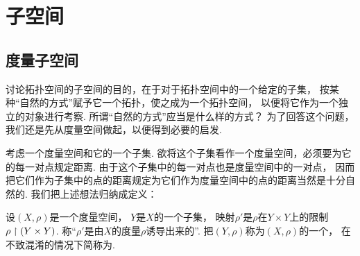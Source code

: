 \section{子空间}
\subsection{度量子空间}
讨论拓扑空间的子空间的目的，在于对于拓扑空间中的一个给定的子集，
按某种“自然的方式”赋予它一个拓扑，使之成为一个拓扑空间，
以便将它作为一个独立的对象进行考察.
所谓“自然的方式”应当是什么样的方式？
为了回答这个问题，我们还是先从度量空间做起，以便得到必要的启发.

考虑一个度量空间和它的一个子集.
欲将这个子集看作一个度量空间，必须要为它的每一对点规定距离.
由于这个子集中的每一对点也是度量空间中的一对点，
因而把它们作为子集中的点的距离规定为它们作为度量空间中的点的距离当然是十分自然的.
我们把上述想法归纳成定义：
\begin{definition}
设\((X,\rho)\)是一个度量空间，
\(Y\)是\(X\)的一个子集，
映射\(\rho'\)是\(\rho\)在\(Y \times Y\)上的限制\(\rho \upharpoonright (Y \times Y)\).
称“\(\rho'\)是由\(X\)的度量\(\rho\)诱导出来的”.
把\((Y,\rho)\)称为\((X,\rho)\)的一个，
在不致混淆的情况下简称为.
\end{definition}

